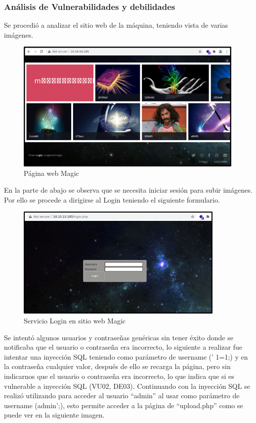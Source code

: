 \subsubsection{Análisis de Vulnerabilidades y debilidades}
Se procedió a analizar el sitio web de la máquina, teniendo vista de varias imágenes.
\begin{figure}[H]
    \centering
    \includegraphics[width=0.99\textwidth]{imagenes/pagmag.png}
    \caption{Página web Magic}
\end{figure}
En la parte de abajo se observa que se necesita iniciar sesión para subir imágenes. Por ello se procede a dirigirse al Login teniendo el siguiente formulario.
\begin{figure}[H]
    \centering
    \includegraphics[width=0.9\textwidth]{imagenes/logmag.png}
    \caption{Servicio Login en sitio web Magic}
\end{figure}
Se intentó algunos usuarios y contraseñas genéricas sin tener éxito donde se notificaba que el usuario o contraseña era incorrecto, lo siguiente a realizar fue intentar una inyección SQL teniendo como parámetro de username (’ 1=1;) y en la contraseña cualquier valor, después de ello se recarga la página, pero sin indicarnos que el usuario o contraseña era incorrecto, lo que indica que si es vulnerable a inyección SQL (VU02, DE03). Continuando con la inyección SQL se realizó utilizando para acceder al usuario “admin” al usar como parámetro de username (admin’;), esto permite acceder a la página de “upload.php” como se puede ver en la siguiente imagen.
